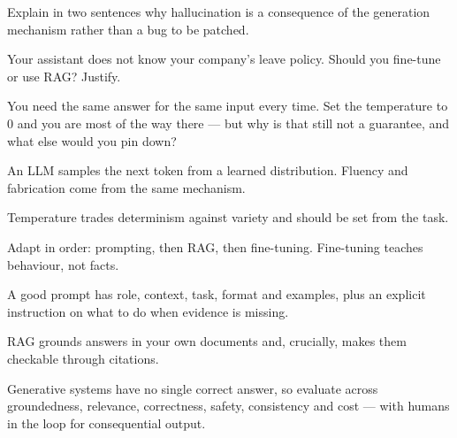 \begin{checkpoint}
\begin{tightnum}
  \item Explain in two sentences why hallucination is a consequence of the
        generation mechanism rather than a bug to be patched.
  \item Your assistant does not know your company's leave policy. Should you
        fine-tune or use RAG? Justify.
  \item You need the same answer for the same input every time. Set the temperature
        to 0 and you are most of the way there --- but why is that still not a
        guarantee, and what else would you pin down?
\end{tightnum}
\end{checkpoint}

\begin{chaptersummary}
\begin{tight}
  \item An LLM samples the next token from a learned distribution. Fluency and
        fabrication come from the same mechanism.
  \item Temperature trades determinism against variety and should be set from the
        task.
  \item Adapt in order: prompting, then RAG, then fine-tuning. Fine-tuning teaches
        behaviour, not facts.
  \item A good prompt has role, context, task, format and examples, plus an explicit
        instruction on what to do when evidence is missing.
  \item RAG grounds answers in your own documents and, crucially, makes them
        checkable through citations.
  \item Generative systems have no single correct answer, so evaluate across
        groundedness, relevance, correctness, safety, consistency and cost --- with
        humans in the loop for consequential output.
\end{tight}
\end{chaptersummary}


